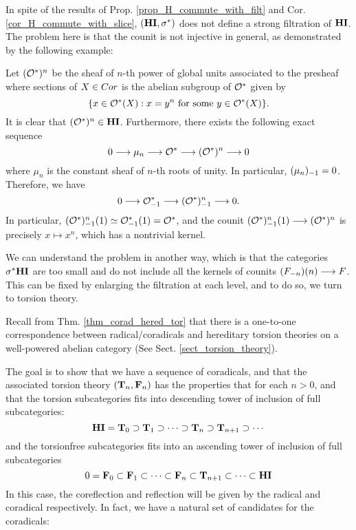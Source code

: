 
In spite of the results of Prop. \ref{prop_H_commute_with_filt} 
and Cor. \ref{cor_H_commute_with_slice}, $(\HI, \sgHI{*})$ does 
not define a strong filtration of $\HI$. The problem here is 
that the counit is not injective in general, as demonstrated by 
the following example: 

\begin{ex}\label{ex_Oxn}
Let $(\Ox)^n$ be the sheaf of $n$-th power of global units 
associated to the presheaf where sections of $X \in \Cor$ is the 
abelian subgroup of $\Ox$ given by 
\[
\{x \in \Ox(X) : x=y^n\textrm{ for some }y \in \Ox(X)\}.
\]
It is clear that $(\Ox)^n \in \HI$. Furthermore, there exists the 
following exact sequence 
\[
0 \to \mu_n \to \Ox \to (\Ox)^n \to 0
\]
where $\mu_n$ is the constant sheaf of $n$-th roots of unity.
In particular, $\RHI{(\mu_n)} = 0$. Therefore, we have
\[
0 \to \RHI{\Ox} \to \RHI{(\Ox)^{n}} \to 0.
\]
In particular, $\LHI{\RHI{(\Ox)^n}} \simeq \LHI{\RHI{\Ox}} = \Ox$, 
and the counit $\LHI{\RHI{(\Ox)^n}} \to (\Ox)^n$ is precisely $x 
\mapsto x^n$, which has a nontrivial kernel.
\end{ex}
\vskip 10pt
We can understand the problem in another way, which is that the 
categories $\sgHI{*}\HI$ are too small and do not include all
the kernels of counits $\LHI[n]{(\RHI[n]{F})} \to F$. This can be 
fixed by enlarging the filtration at each level, and to do so, we 
turn to torsion theory.

Recall from Thm. \ref{thm_corad_hered_tor} that there is a 
one-to-one correspondence between radical/coradicals and hereditary
torsion theories on a well-powered abelian category (See Sect.
\ref{sect_torsion_theory}).

The goal is to show that we have a sequence of coradicals, and
that the associated torsion theory $(\TCat{n}, \TFCat{n})$ has
the properties that for each $n > 0$, and that the torsion 
subcategories fits into descending tower of inclusion of full 
subcategories:
\[
\HI = \TCat{0} \supset \TCat{1} \supset \cdots \supset \TCat{n} 
   \supset \TCat{n + 1} \supset \cdots
\]
and the torsionfree subcategories fits into an ascending tower
of inclusion of full subcategories
\[
0 = \TFCat{0} \subset \TFCat{1} \subset \cdots \subset \TFCat{n}
   \subset \TCat{n + 1} \subset \cdots \subset \HI
\]
In this case, the coreflection and reflection will be given by
the radical and coradical respectively. In fact, we have a
natural set of candidates for the coradicals:

